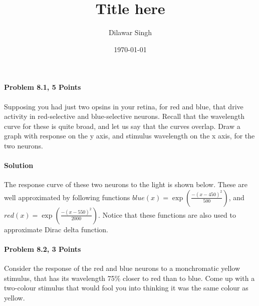 \documentclass[a4paper,10pt]{article}
\title{Title here}
\author{Dilawar Singh}
\date{\today}
\begin{document}
\maketitle

\paragraph{Problem 8.1, 5 Points}

Supposing you had just two opsins in your retina, for red and blue, that drive
activity in red-selective and blue-selective neurons. Recall that the wavelength
curve for these is quite broad, and let us say that the curves overlap.  Draw a
graph with response on the y axis, and stimulus wavelength on the x axis, for
the two neurons.

\paragraph{Solution} The response curve of these two neurons to the light is
shown below. These are well approximated by following functions $blue(x) =
\exp\left( \frac{-(x-450)^2}{500}\right)$, and $red(x) = \exp\left(
\frac{-(x-550)^2}{2000}\right)$. Notice that these functions are also used to
approximate Dirac delta function.



\paragraph{Problem 8.2, 3 Points}
Consider the response of the red and blue neurons to a monchromatic yellow
stimulus, that has its wavelength 75\% closer to red than to blue. Come up with a
two-colour stimulus that would fool you into thinking it was the same colour as
yellow.
\end{document}
